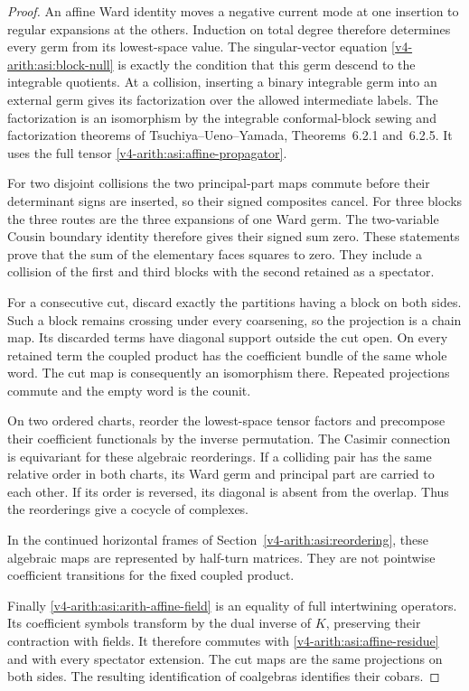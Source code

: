 \begin{proof}
An affine Ward identity moves a negative current mode at one insertion
to regular expansions at the others. Induction on total degree
therefore determines every germ from its lowest-space value. The
singular-vector equation \eqref{v4-arith:asi:block-null} is exactly the
condition that this germ descend to the integrable quotients. At a
collision, inserting a binary integrable germ into an external germ
gives its factorization over the allowed intermediate labels. The
factorization is an isomorphism by the integrable conformal-block
sewing and factorization theorems of Tsuchiya--Ueno--Yamada,
Theorems~6.2.1 and~6.2.5.
It uses the full tensor
\eqref{v4-arith:asi:affine-propagator}.

For two disjoint collisions the two principal-part maps commute before
their determinant signs are inserted, so their signed composites
cancel. For three blocks the three routes are the three expansions of
one Ward germ. The two-variable Cousin boundary identity therefore
gives their signed sum zero. These statements prove that the sum of
the elementary faces squares to zero. They include a collision of the
first and third blocks with the second retained as a spectator.

For a consecutive cut, discard exactly the partitions having a block
on both sides. Such a block remains crossing under every coarsening,
so the projection is a chain map. Its discarded terms have diagonal
support outside the cut open. On every retained term the coupled
product has the coefficient bundle of the same whole word. The cut
map is consequently an isomorphism there. Repeated projections
commute and the empty word is the counit.

On two ordered charts, reorder the lowest-space tensor factors and
precompose their coefficient functionals by the inverse permutation.
The Casimir connection is equivariant for these algebraic reorderings.
If a colliding pair has the same relative order in both charts, its
Ward germ and principal part are carried to each other. If its order
is reversed, its diagonal is absent from the overlap. Thus the
reorderings give a cocycle of complexes.

In the continued horizontal frames of
Section~\ref{v4-arith:asi:reordering}, these algebraic maps are
represented by half-turn matrices. They are not pointwise
coefficient transitions for the fixed coupled product.

Finally \eqref{v4-arith:asi:arith-affine-field} is an equality of full
intertwining operators. Its coefficient symbols transform by the dual
inverse of $K$, preserving their contraction with fields. It therefore
commutes with \eqref{v4-arith:asi:affine-residue} and with every spectator
extension. The cut maps are the same projections on both sides.
The resulting identification of coalgebras identifies their cobars.
\end{proof}

